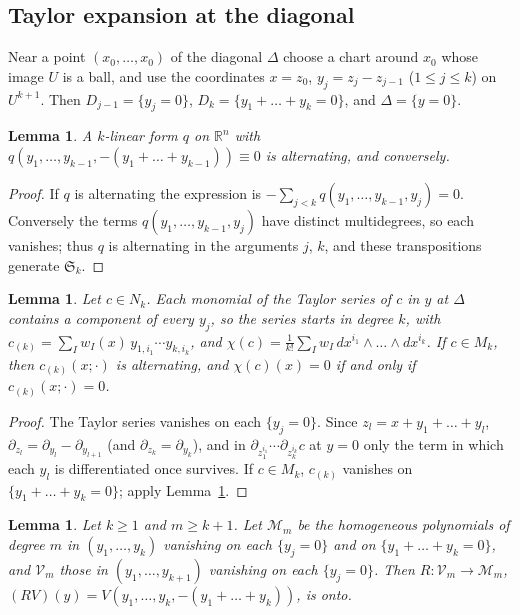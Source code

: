 \documentclass[11pt,oneside,reqno]{article}
\newcommand{\R}{\mathbb R}
\newcommand{\pa}{\partial}
\theoremstyle{plain}
\newtheorem{lemma}[theorem]{Lemma}
\theoremstyle{definition}
\theoremstyle{remark}
\begin{document}
\subsection{Taylor expansion at the diagonal}
Near a point \((x_0,\dots,x_0)\) of the diagonal \(\Delta\) choose a chart around \(x_0\) whose
image \(U\) is a ball, and use the coordinates \(x=z_0\), \(y_j=z_j-z_{j-1}\) (\(1\le j\le k\)) on \(U^{k+1}\).
Then \(D_{j-1}=\{y_j=0\}\), \(D_k=\{y_1+\dots+y_k=0\}\), and \(\Delta=\{y=0\}\).

\begin{lemma}\label{lem:antisym}
A \(k\)-linear form \(q\) on \(\R^n\) with \(q(y_1,\dots,y_{k-1},-(y_1+\dots+y_{k-1}))\equiv0\) is
alternating, and conversely.
\end{lemma}

\begin{proof}
If \(q\) is alternating the expression is \(-\sum_{j<k}q(y_1,\dots,y_{k-1},y_j)=0\). Conversely the
terms \(q(y_1,\dots,y_{k-1},y_j)\) have distinct multidegrees, so each vanishes; thus \(q\) is
alternating in the arguments \(j\), \(k\), and these transpositions generate \(\mathfrak S_k\).
\end{proof}

\begin{lemma}\label{lem:leading}
Let \(c\in N_k\). Each monomial of the Taylor series of \(c\) in \(y\) at \(\Delta\) contains a component
of every \(y_j\), so the series starts in degree \(k\), with
\(c_{(k)}=\sum_Iw_I(x)\,y_{1,i_1}\cdots y_{k,i_k}\), and \(\chi(c)=\frac1{k!}\sum_Iw_I\,dx^{i_1}\wedge\dots\wedge dx^{i_k}\).
If \(c\in M_k\), then \(c_{(k)}(x;\cdot)\) is alternating, and \(\chi(c)(x)=0\) if and only if
\(c_{(k)}(x;\cdot)=0\).
\end{lemma}

\begin{proof}
The Taylor series vanishes on each \(\{y_j=0\}\). Since \(z_l=x+y_1+\dots+y_l\),
\(\pa_{z_l}=\pa_{y_l}-\pa_{y_{l+1}}\) (and \(\pa_{z_k}=\pa_{y_k}\)), and in
\(\pa_{z_1^{i_1}}\cdots\pa_{z_k^{i_k}}c\) at \(y=0\) only the term in which each \(y_l\) is differentiated once
survives. If \(c\in M_k\), \(c_{(k)}\) vanishes on \(\{y_1+\dots+y_k=0\}\); apply
Lemma~\ref{lem:antisym}.
\end{proof}

\begin{lemma}\label{lem:polylift}
Let \(k\ge1\) and \(m\ge k+1\). Let \(\mathcal M_m\) be the homogeneous polynomials of degree \(m\) in
\((y_1,\dots,y_k)\) vanishing on each \(\{y_j=0\}\) and on \(\{y_1+\dots+y_k=0\}\), and \(\mathcal V_m\) those in
\((y_1,\dots,y_{k+1})\) vanishing on each \(\{y_j=0\}\). Then
\(R:\mathcal V_m\to\mathcal M_m\), \((RV)(y)=V(y_1,\dots,y_k,-(y_1+\dots+y_k))\), is onto.
\end{lemma}
\end{document}
